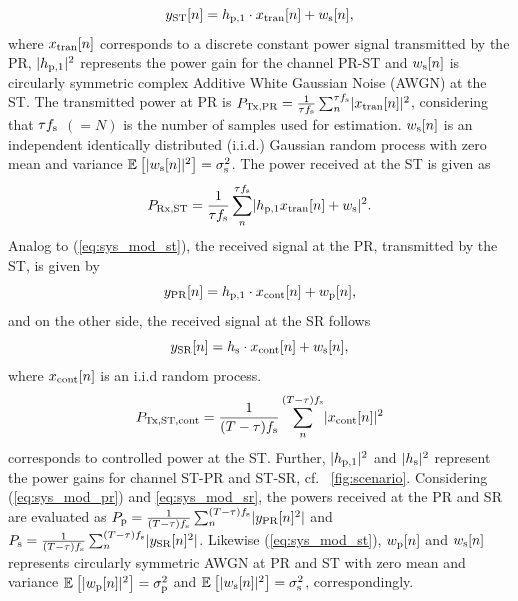 \begin{equation}
y_{\text{ST}}[n] = h_{\text{p,1}} \cdot x_{\text{tran}}[n] + w_{\text{s}}[n],
\label{eq:sys_mod_st}
\end{equation}
where $x_{\text{tran}}[n]$ corresponds to a discrete constant power signal transmitted by the PR, $|h_{\text{p,1}}|^2$ represents the power gain for the channel PR-ST and $w_{\text{s}}[n]$ is circularly symmetric complex Additive White Gaussian Noise (AWGN) at the ST.
The transmitted power at PR is $P_{\text{Tx,PR}} = {\frac{1}{{\tau f_{\text{s}}}}\sum_n^{\tau f_{\text{s}}}} {|x_{\text{tran}}[n]|^2}$, considering that $\tau f_{\text{s}}$ $(= N)$ is the number of samples used for estimation. $w_{\text{s}}[n]$ is an independent identically distributed (i.i.d.) Gaussian random process with zero mean and variance ${\mathbb E}_{}\left[ |w_{\text{s}}[n]|^2 \right] = \sigma^2_{\text{s}}$. The power received at the ST is given as
\begin{align}
P_{\text{Rx,ST}} = {\frac{1}{{\tau f_{\text{s}}}}\sum_n^{\tau f_{\text{s}}}} { |h_{\text{p,1}} x_{\text{tran}}[n] + w_{\text{s}}|^2}.
\label{eq:prcvd} 
\end{align}
Analog to (\ref{eq:sys_mod_st}), the received signal at the PR, transmitted by the ST, is given by
\begin{equation}
y_{\text{PR}}[n] = h_{\text{p,1}} \cdot x_{\text{cont}}[n] + w_{\text{p}}[n],
\label{eq:sys_mod_pr}
\end{equation}
and on the other side, the received signal at the SR follows
\begin{equation}
y_{\text{SR}}[n] = h_{\text{s}} \cdot x_{\text{cont}}[n] + w_{\text{s}}[n],
\label{eq:sys_mod_sr}
\end{equation}
where $x_{\text{cont}}[n]$ is an i.i.d random process. 
\begin{align}
P_{\text{Tx,ST,cont}} = {\frac{1}{{(T - \tau) f_{\text{s}}}}\sum_n^{(T - \tau) f_{\text{s}}}} {|x_{\text{cont}}[n]|^2} 
\label{eq:preg} 
\end{align}
corresponds to controlled power at the ST. Further, $|h_{\text{p,1}}|^2$ and $|h_{\text{s}}|^2$ represent the power gains for channel ST-PR and ST-SR, cf. \figurename~\ref{fig:scenario}.
Considering (\ref{eq:sys_mod_pr}) and \ref{eq:sys_mod_sr}, the powers received at the PR and SR are evaluated as $P_{\text{p}} = {\frac{1}{{(T - \tau) f_{\text{s}}}}\sum_n^{(T - \tau) f_{\text{s}}}} {|y_{\text{PR}}[n]^2|}$ and $P_{\text{s}} = {\frac{1}{{(T - \tau) f_{\text{s}}}}\sum_n^{(T - \tau) f_{\text{s}}}} {|y_{\text{SR}}[n]^2|}$. Likewise (\ref{eq:sys_mod_st}), $w_{\text{p}}[n]$ and $w_{\text{s}}[n]$ represents circularly symmetric AWGN at PR and ST with zero mean and variance ${\mathbb E}_{}\left[ |w_{\text{p}}[n]|^2 \right] = \sigma^2_{\text{p}}$ and ${\mathbb E}_{}\left[ |w_{\text{s}}[n]|^2 \right] = \sigma^2_{\text{s}}$, correspondingly. %

